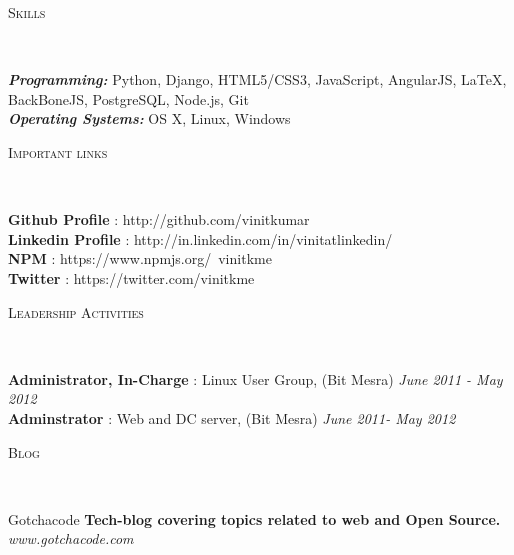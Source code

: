 \documentclass[9pt]{article}
\newenvironment{changemargin}[2]{%
  \begin{list}{}{%
    \setlength{\topsep}{0pt}%
    \setlength{\leftmargin}{#1}%
    \setlength{\rightmargin}{#2}%
    \setlength{\listparindent}{\parindent}%
    \setlength{\itemindent}{\parindent}%
    \setlength{\parsep}{\parskip}%
  }%
  \item[]}{\end{list}
}
\newcommand{\lineover}{
	\begin{changemargin}{-0.05in}{-0.05in}
		\vspace*{-8pt}
		\hrulefill \\
		\vspace*{-2pt}
	\end{changemargin}
}
\newcommand{\header}[1]{
	\begin{changemargin}{-0.5in}{-0.5in}
		\scshape{#1}\\
  	\lineover
	\end{changemargin}
}
\newenvironment{body} {
	\vspace*{-16pt}
	\begin{changemargin}{-0.25in}{-0.5in}
  }	
	{\end{changemargin}
}
\begin{document}
\smallskip


\header{Skills}

\begin{body}
	\vspace{14pt}
	\emph{\textbf{Programming:}}{} Python, Django, 
	HTML5/CSS3, JavaScript, AngularJS, \LaTeX, BackBoneJS, PostgreSQL, Node.js, Git\\
	\medskip
	\emph{\textbf{Operating Systems:}}{} OS X, Linux,  Windows\\
\end{body}

\smallskip


\header{Important links}

\begin{body}
	\vspace{14pt}
	\textbf{Github Profile} : http://github.com/vinitkumar \hfill{}\\
	\smallskip
	\textbf{Linkedin Profile} : http://in.linkedin.com/in/vinitatlinkedin/ \hfill{}\\
	\smallskip
	\textbf{NPM} : https://www.npmjs.org/~vinitkme \hfill{}\\
	\smallskip
	\textbf{Twitter} : https://twitter.com/vinitkme \hfill{}\\
\end{body}

\smallskip

\header{Leadership Activities}

\begin{body}
	\vspace{14pt}
	\textbf{Administrator, In-Charge} : Linux User Group, (Bit Mesra) \hfill {} \emph{June 2011 - May 2012}\\
	\smallskip
	\textbf{Adminstrator} : Web and DC server, (Bit Mesra) \hfill{} \emph{June 2011- May 2012}\\
\end{body}

\smallskip

\header{Blog}

\begin{body}
	\vspace{14pt}
	Gotchacode \textbf{Tech-blog covering topics related to web and Open Source.} \emph{ www.gotchacode.com}\\
	\smallskip
\end{body}

\smallskip
\end{document}
